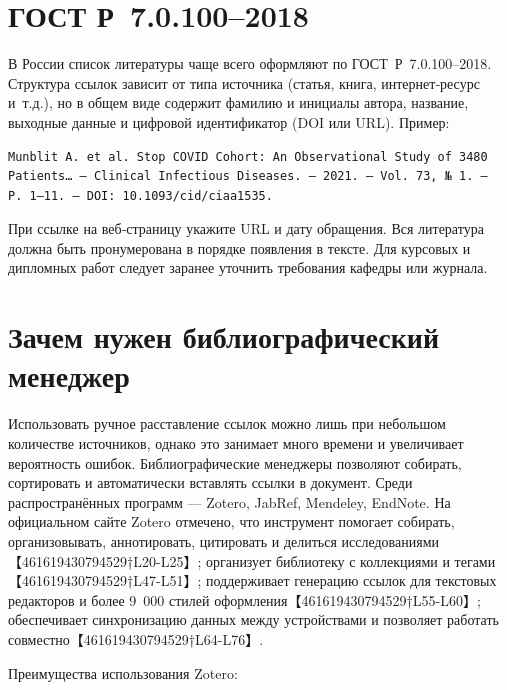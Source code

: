 \documentclass[
  russian,
  letterpaper,
]{book}
\begin{document}
\chapter{ГОСТ
Р~7.0.100--2018}\label{ux433ux43eux441ux442-ux440-7.0.1002018}

В России список литературы чаще всего оформляют по ГОСТ~Р~7.0.100--2018.
Структура ссылок зависит от типа источника (статья, книга,
интернет‑ресурс и~т.д.), но в общем виде содержит фамилию и инициалы
автора, название, выходные данные и цифровой идентификатор (DOI или
URL). Пример:

\begin{verbatim}
Munblit A. et al. Stop COVID Cohort: An Observational Study of 3480 Patients… – Clinical Infectious Diseases. – 2021. – Vol. 73, № 1. – P. 1–11. – DOI: 10.1093/cid/ciaa1535.
\end{verbatim}

При ссылке на веб‑страницу укажите URL и дату обращения. Вся литература
должна быть пронумерована в порядке появления в тексте. Для курсовых и
дипломных работ следует заранее уточнить требования кафедры или журнала.

\chapter{Зачем нужен библиографический
менеджер}\label{ux437ux430ux447ux435ux43c-ux43dux443ux436ux435ux43d-ux431ux438ux431ux43bux438ux43eux433ux440ux430ux444ux438ux447ux435ux441ux43aux438ux439-ux43cux435ux43dux435ux434ux436ux435ux440}

Использовать ручное расставление ссылок можно лишь при небольшом
количестве источников, однако это занимает много времени и увеличивает
вероятность ошибок. Библиографические менеджеры позволяют собирать,
сортировать и автоматически вставлять ссылки в документ. Среди
распространённых программ --- Zotero, JabRef, Mendeley, EndNote. На
официальном сайте Zotero отмечено, что инструмент помогает собирать,
организовывать, аннотировать, цитировать и делиться
исследованиями【461619430794529†L20-L25】; организует библиотеку с
коллекциями и тегами【461619430794529†L47-L51】; поддерживает генерацию
ссылок для текстовых редакторов и более 9~000 стилей
оформления【461619430794529†L55-L60】; обеспечивает синхронизацию данных
между устройствами и позволяет работать
совместно【461619430794529†L64-L76】.

Преимущества использования Zotero:
\end{document}
